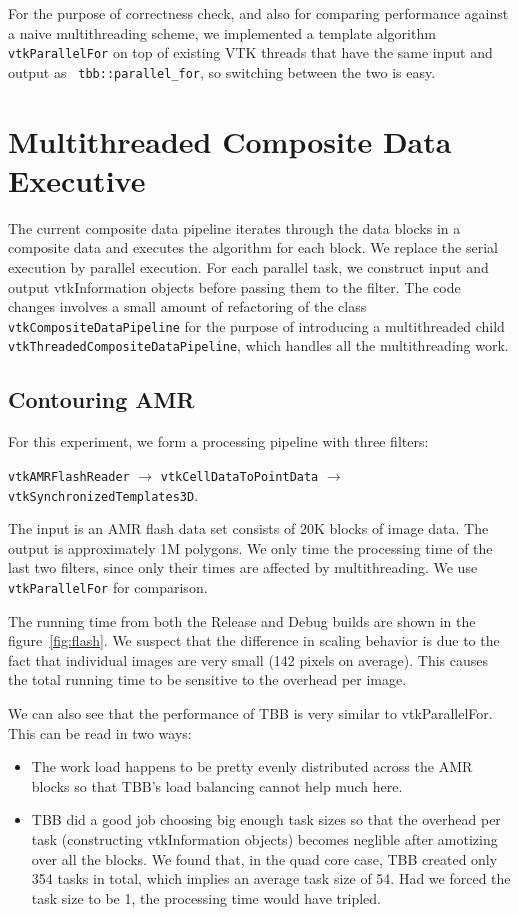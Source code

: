 \documentclass{article}
\begin{document}
For the purpose of correctness check, and also for comparing
performance against a naive multithreading scheme, we implemented a
template algorithm {\tt vtkParallelFor} on top of existing VTK
threads that have the same input and output as {\tt
  tbb::parallel\_for}, so switching between the two is easy.

\section{Multithreaded Composite Data Executive}

The current composite data pipeline iterates through the data blocks
in a composite data and executes the algorithm for each block. We
replace the serial execution by parallel execution. For each parallel
task, we construct input and output vtkInformation objects before
passing them to the filter. The code changes involves a small amount
of refactoring of the class {\tt vtkCompositeDataPipeline} for the purpose
of introducing a multithreaded child {\tt vtkThreadedCompositeDataPipeline},
which handles all the multithreading work.

\subsection{Contouring AMR}
For this experiment, we form a processing pipeline with three
filters:

{\tt vtkAMRFlashReader}  $\rightarrow$ {\tt vtkCellDataToPointData}
 $\rightarrow$ {\tt vtkSynchronizedTemplates3D}.

The input is an AMR flash data set consists of 20K blocks of image
data. The output is approximately 1M polygons. We only time the
processing time of the last two filters, since only their times are
affected by multithreading. We use {\tt vtkParallelFor} for
comparison.

The running time from both the Release and Debug builds are shown in
the figure~\ref{fig:flash}. We suspect that the difference in scaling
behavior is due to the fact that individual images are very small (142
pixels on average). This causes the total running time to be sensitive
to the overhead per image.

We can also see that the performance of TBB is very similar to
vtkParallelFor. This can be read in two ways:
\begin{itemize}
\item The work load happens to be pretty evenly distributed across the
  AMR blocks so that TBB's load balancing cannot help much here.
\item TBB did a good job choosing big enough task sizes so that the
  overhead per task (constructing vtkInformation objects) becomes
  neglible after amotizing over all the blocks. We found that, in the
  quad core case, TBB created only 354 tasks in total, which implies
  an average task size of 54. Had we forced the task size to be 1, the
  processing time would have tripled.
\end{itemize}
\end{document}
